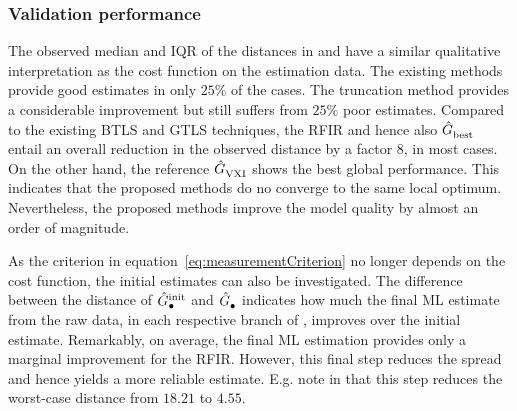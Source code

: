 \subsubsection{Validation performance}
The observed median and \gls{IQR} of the distances in  and  have a similar qualitative interpretation as the cost function on the estimation data.
The existing methods provide good estimates in only $25\%$ of the cases.
The truncation method provides a considerable improvement but still suffers from $25\%$ poor estimates.
Compared to the existing \gls{BTLS} and \gls{GTLS} techniques, the \gls{RFIR} and hence also $\model{best}$ entail an overall reduction in the observed distance by a factor $8$, in most cases. 
On the other hand, the reference $\model{VXI}$ shows the best global performance. 
This indicates that the proposed methods do no converge to the same local optimum.
Nevertheless, the proposed methods improve the model quality by almost an order of magnitude.

As the criterion in equation~\eqref{eq:measurementCriterion} no longer depends on the cost function, the initial estimates can also be investigated.
The difference between the distance of $\model[init]{\bullet}$ and $\model{\bullet}$ indicates how much the final ML estimate from the raw data, in each respective branch of , improves over the initial estimate.
Remarkably, on average, the final ML estimation provides only a marginal improvement for the \gls{RFIR}. 
However, this final step reduces the spread and hence yields a more reliable estimate.
E.g. note in  that this step reduces the worst-case distance from $18.21$ to $4.55$.


